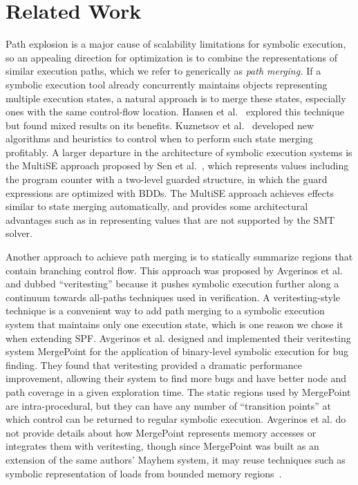 \section{Related Work}
Path explosion is a major cause of scalability limitations for
symbolic execution, so an appealing direction for optimization is to
combine the representations of similar execution paths, which we refer
to generically as {\em path merging.}
%
If a symbolic execution tool already concurrently maintains objects
representing multiple execution states, a natural approach is to merge
these states, especially ones with the same control-flow location.
%
Hansen et al.~\cite{HansenSS2009} explored this technique but found
mixed results on its benefits.
%
Kuznetsov et al.~\cite{kuznetsov} developed new algorithms and
heuristics to control when to perform such state merging profitably.
%
A larger departure in the architecture of symbolic execution systems
is the MultiSE approach proposed by Sen et al.~\cite{multise}, which
represents values including the program counter with a two-level
guarded structure, in which the guard expressions are optimized with
BDDs.
%
The MultiSE approach achieves effects similar to state merging
automatically, and provides some architectural advantages such as in
representing values that are not supported by the SMT solver.

Another approach to achieve path merging is to statically summarize
regions that contain branching control flow.
%
This approach was proposed by Avgerinos et al.~\cite{veritesting} and
dubbed ``veritesting'' because it pushes symbolic execution further
along a continuum towards all-paths techniques used in verification.
%
A veritesting-style technique is a convenient way to add path merging
to a symbolic execution system that maintains only one execution
state, which is one reason we chose it when extending SPF.
%
Avgerinos et al. designed and implemented their veritesting system
MergePoint for the application of binary-level symbolic execution for
bug finding.
%
They found that veritesting provided a dramatic performance
improvement, allowing their system to find more bugs and have better
node and path coverage in a given exploration time.
%
The static regions used by MergePoint are intra-procedural, but they
can have any number of ``transition points'' at which control can be
returned to regular symbolic execution.
%
Avgerinos et al. do not provide details about how MergePoint
represents memory accesses or integrates them with veritesting, though
since MergePoint was built as an extension of the same authors' Mayhem
system, it may reuse techniques such as symbolic representation of
loads from bounded memory regions~\cite{mayhem}.

